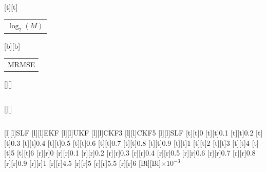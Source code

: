%    
%
%
\begin{psfrags}%
\psfragscanon%
%
[t][t]{\color[rgb]{0,0,0}\setlength{\tabcolsep}{0pt}\begin{tabular}{c}$\log_2 (M)$\end{tabular}}%
[b][b]{\color[rgb]{0,0,0}\setlength{\tabcolsep}{0pt}\begin{tabular}{c}MRMSE\end{tabular}}%
[][]{\color[rgb]{0,0,0}\setlength{\tabcolsep}{0pt}\begin{tabular}{c} \end{tabular}}%
[][]{\color[rgb]{0,0,0}\setlength{\tabcolsep}{0pt}\begin{tabular}{c} \end{tabular}}%
[l][l]{\color[rgb]{0,0,0}SLF}%
[l][l]{\color[rgb]{0,0,0}EKF}%
[l][l]{\color[rgb]{0,0,0}UKF}%
[l][l]{\color[rgb]{0,0,0}CKF3}%
[l][l]{\color[rgb]{0,0,0}CKF5}%
[l][l]{\color[rgb]{0,0,0}SLF}%
%
[t][t]{0}%
[t][t]{0.1}%
[t][t]{0.2}%
[t][t]{0.3}%
[t][t]{0.4}%
[t][t]{0.5}%
[t][t]{0.6}%
[t][t]{0.7}%
[t][t]{0.8}%
[t][t]{0.9}%
[t][t]{1}%
[t][t]{2}%
[t][t]{3}%
[t][t]{4}%
[t][t]{5}%
[t][t]{6}%
%
[r][r]{0}%
[r][r]{0.1}%
[r][r]{0.2}%
[r][r]{0.3}%
[r][r]{0.4}%
[r][r]{0.5}%
[r][r]{0.6}%
[r][r]{0.7}%
[r][r]{0.8}%
[r][r]{0.9}%
[r][r]{1}%
[r][r]{4.5}%
[r][r]{5}%
[r][r]{5.5}%
[r][r]{6}%
[Bl][Bl]{$\times 10^{-3}$}%
%

\end{psfrags}
